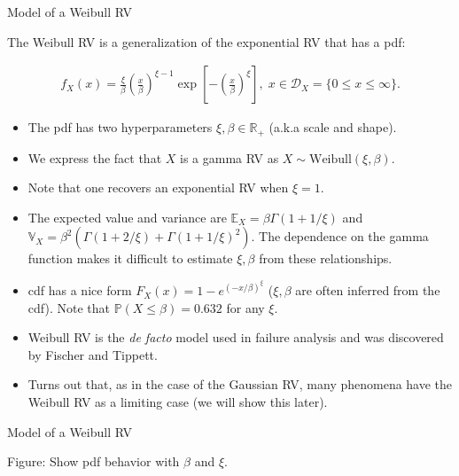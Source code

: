 \documentclass[9pt]{beamer}
\begin{document}
%
\begin{frame}{Model of a Weibull RV}

The Weibull RV is a generalization of the exponential RV that has a pdf:
\begin{block}{}
\begin{align*}
f_X(x)=\frac{\xi}{\beta}\left(\frac{x}{\beta}\right)^{\xi-1}\exp\left[{-\left(\frac{x}{\beta}\right)^\xi}\right],\; x\in \mathcal{D}_X=\{0\leq x\leq \infty\}.
\end{align*}
\end{block}
\begin{itemize}
\item The pdf has two hyperparameters $\xi,\beta\in \mathbb{R}_+$ (a.k.a scale and shape).
\item We express the fact that $X$ is a gamma RV as $X\sim \textrm{Weibull}(\xi,\beta)$.
\item Note that one recovers an exponential RV when $\xi=1$. 
\item The expected value and variance are $\mathbb{E}_X=\beta\Gamma(1+1/\xi)$ and $\mathbb{V}_X=\beta^2\left(\Gamma(1+2/\xi)+\Gamma(1+1/\xi)^2\right)$. The dependence on the gamma function makes it difficult to estimate $\xi,\beta$ from these relationships. 
\item cdf has a nice form $F_X(x)=1-e^{(-x/\beta)^\xi}$ ($\xi,\beta$ are often inferred from the cdf). Note that $\mathbb{P}(X\leq \beta)=0.632$ for any $\xi$. 
\item Weibull RV is the {\em de facto} model used in failure analysis and was discovered by Fischer and Tippett. 
\item Turns out that, as in the case of the Gaussian RV, many phenomena have the Weibull RV as a limiting case (we will show this later). 
\end{itemize}

\end{frame}

%
\begin{frame}{Model of a Weibull RV}
\begin{block}{}
{\color{red} Figure: Show pdf behavior with $\beta$ and $\xi$.}
\end{block}

\end{frame}
\end{document}
